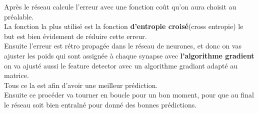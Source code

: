 Après le réseau calcule l'erreur avec une fonction coût qu'on aura choisit au préalable.\\
La fonction la plus utilisé est la fonction \textbf{d’entropie croisé}(cross entropie) le but est bien évidement de réduire cette erreur.\\
Ensuite l'erreur est rétro propagée dans le réseau de neurones, et donc on vas ajuster les poids qui sont assignée à chaque synapse avec \textbf{l’algorithme gradient} on va ajusté aussi le feature detector avec un algorithme gradiant adapté au matrice.\\
Tous ce la est afin d'avoir une meilleur prédiction.\\
Ensuite ce procéder  va tourner en boucle pour un bon moment, pour que au final le réseau soit bien entraîné pour donné des bonnes prédictions.\\[1cm]

